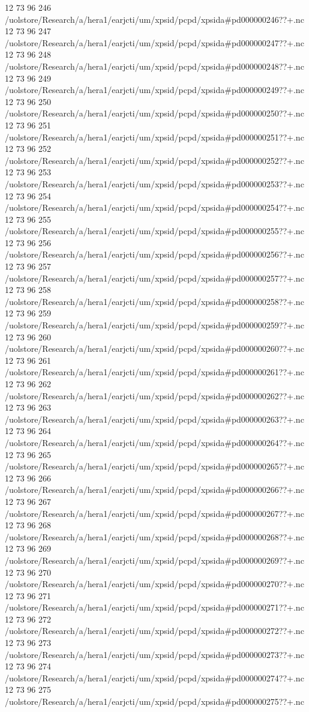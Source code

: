 12 73 96
246
/uolstore/Research/a/hera1/earjcti/um/xpsid/pcpd/xpsida#pd000000246??+.nc
12 73 96
247
/uolstore/Research/a/hera1/earjcti/um/xpsid/pcpd/xpsida#pd000000247??+.nc
12 73 96
248
/uolstore/Research/a/hera1/earjcti/um/xpsid/pcpd/xpsida#pd000000248??+.nc
12 73 96
249
/uolstore/Research/a/hera1/earjcti/um/xpsid/pcpd/xpsida#pd000000249??+.nc
12 73 96
250
/uolstore/Research/a/hera1/earjcti/um/xpsid/pcpd/xpsida#pd000000250??+.nc
12 73 96
251
/uolstore/Research/a/hera1/earjcti/um/xpsid/pcpd/xpsida#pd000000251??+.nc
12 73 96
252
/uolstore/Research/a/hera1/earjcti/um/xpsid/pcpd/xpsida#pd000000252??+.nc
12 73 96
253
/uolstore/Research/a/hera1/earjcti/um/xpsid/pcpd/xpsida#pd000000253??+.nc
12 73 96
254
/uolstore/Research/a/hera1/earjcti/um/xpsid/pcpd/xpsida#pd000000254??+.nc
12 73 96
255
/uolstore/Research/a/hera1/earjcti/um/xpsid/pcpd/xpsida#pd000000255??+.nc
12 73 96
256
/uolstore/Research/a/hera1/earjcti/um/xpsid/pcpd/xpsida#pd000000256??+.nc
12 73 96
257
/uolstore/Research/a/hera1/earjcti/um/xpsid/pcpd/xpsida#pd000000257??+.nc
12 73 96
258
/uolstore/Research/a/hera1/earjcti/um/xpsid/pcpd/xpsida#pd000000258??+.nc
12 73 96
259
/uolstore/Research/a/hera1/earjcti/um/xpsid/pcpd/xpsida#pd000000259??+.nc
12 73 96
260
/uolstore/Research/a/hera1/earjcti/um/xpsid/pcpd/xpsida#pd000000260??+.nc
12 73 96
261
/uolstore/Research/a/hera1/earjcti/um/xpsid/pcpd/xpsida#pd000000261??+.nc
12 73 96
262
/uolstore/Research/a/hera1/earjcti/um/xpsid/pcpd/xpsida#pd000000262??+.nc
12 73 96
263
/uolstore/Research/a/hera1/earjcti/um/xpsid/pcpd/xpsida#pd000000263??+.nc
12 73 96
264
/uolstore/Research/a/hera1/earjcti/um/xpsid/pcpd/xpsida#pd000000264??+.nc
12 73 96
265
/uolstore/Research/a/hera1/earjcti/um/xpsid/pcpd/xpsida#pd000000265??+.nc
12 73 96
266
/uolstore/Research/a/hera1/earjcti/um/xpsid/pcpd/xpsida#pd000000266??+.nc
12 73 96
267
/uolstore/Research/a/hera1/earjcti/um/xpsid/pcpd/xpsida#pd000000267??+.nc
12 73 96
268
/uolstore/Research/a/hera1/earjcti/um/xpsid/pcpd/xpsida#pd000000268??+.nc
12 73 96
269
/uolstore/Research/a/hera1/earjcti/um/xpsid/pcpd/xpsida#pd000000269??+.nc
12 73 96
270
/uolstore/Research/a/hera1/earjcti/um/xpsid/pcpd/xpsida#pd000000270??+.nc
12 73 96
271
/uolstore/Research/a/hera1/earjcti/um/xpsid/pcpd/xpsida#pd000000271??+.nc
12 73 96
272
/uolstore/Research/a/hera1/earjcti/um/xpsid/pcpd/xpsida#pd000000272??+.nc
12 73 96
273
/uolstore/Research/a/hera1/earjcti/um/xpsid/pcpd/xpsida#pd000000273??+.nc
12 73 96
274
/uolstore/Research/a/hera1/earjcti/um/xpsid/pcpd/xpsida#pd000000274??+.nc
12 73 96
275
/uolstore/Research/a/hera1/earjcti/um/xpsid/pcpd/xpsida#pd000000275??+.nc
